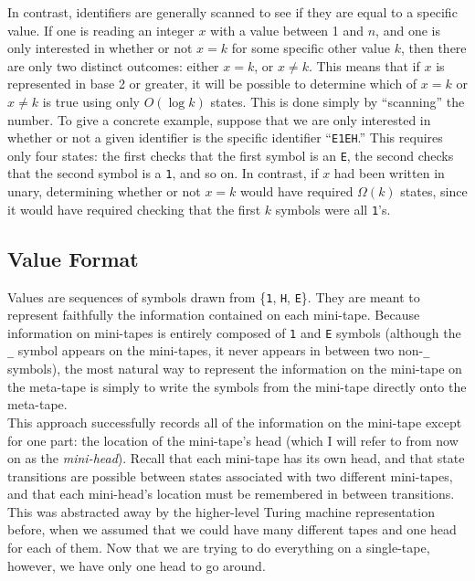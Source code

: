 \documentclass{report}
\begin{document}
In contrast, identifiers are generally scanned to see if they are equal to a specific value. If one is reading an integer $x$ with a value between 1 and $n$, and one is only interested in whether or not $x = k$ for some specific other value $k$, then there are only two distinct outcomes: either $x = k$, or $x \not= k$. This means that if $x$ is represented in base 2 or greater, it will be possible to determine which of $x = k$ or $x \not= k$ is true using only $O(\log k)$ states. This is done simply by ``scanning'' the number. To give a concrete example, suppose that we are only interested in whether or not a given identifier is the specific identifier ``\texttt{E1EH}.'' This requires only four states: the first checks that the first symbol is an \texttt{E}, the second checks that the second symbol is a \texttt{1}, and so on. In contrast, if $x$ had been written in unary, determining whether or not $x = k$ would have required $\Omega(k)$ states, since it would have required checking that the first $k$ symbols were all \texttt{1}'s. \\

\subsection{Value Format}

Values are sequences of symbols drawn from \{\texttt{1}, \texttt{H}, \texttt{E}\}. They are meant to represent faithfully the information contained on each mini-tape. Because information on mini-tapes is entirely composed of \texttt{1} and \texttt{E} symbols (although the \texttt{\_} symbol appears on the mini-tapes, it never appears in between two non-\texttt{\_} symbols), the most natural way to represent the information on the mini-tape on the meta-tape is simply to write the symbols from the mini-tape directly onto the meta-tape. \\

This approach successfully records all of the information on the mini-tape except for one part: the location of the mini-tape's head (which I will refer to from now on as the \emph{mini-head}). Recall that each mini-tape has its own head, and that state transitions are possible between states associated with two different mini-tapes, and that each mini-head's location must be remembered in between transitions. This was abstracted away by the higher-level Turing machine representation before, when we assumed that we could have many different tapes and one head for each of them. Now that we are trying to do everything on a single-tape, however, we have only one head to go around. \\
\end{document}
